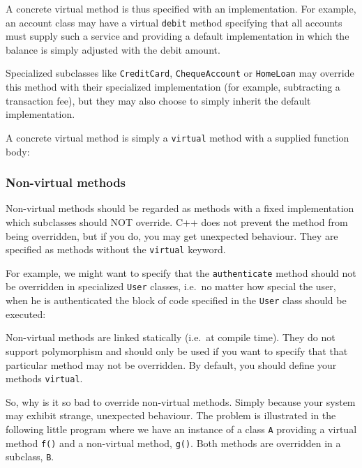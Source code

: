 A concrete virtual method is thus specified with an implementation.
For example, an account class may have a virtual \verb+debit+ method
specifying that all accounts must supply such a service and providing
a default implementation in which the balance is simply adjusted with
the debit amount.

Specialized subclasses like \verb+CreditCard+, \verb+ChequeAccount+
or \verb+HomeLoan+ may override this method with their specialized
implementation (for example, subtracting a transaction fee), but they
may also choose to simply inherit the default implementation.

A concrete virtual method is simply a \verb+virtual+ method with a
supplied function body:



\subsubsection{Non-virtual methods}

Non-virtual methods should be regarded as methods with a fixed 
implementation which subclasses should NOT override. C++ does 
not prevent the method from being overridden, but if you do, 
you may get unexpected behaviour. They are specified as methods
without the \verb+virtual+ keyword. 

For example, we might want to specify that the \verb+authenticate+ 
method should not be overridden in specialized \verb+User+ classes,
i.e.\ no matter how special the user, when he is authenticated the
block of code specified in the \verb+User+ class should be executed:

    
Non-virtual methods are linked statically (i.e.\ at compile time). 
They do not support polymorphism and should only be used if you want to
specify that that particular method may not be overridden. By default, you
should define your methods \verb+virtual+.

So, why is it so bad to override non-virtual methods. Simply because your
system may exhibit strange, unexpected behaviour. The problem is 
illustrated in the following little program where we have an instance of
a class \verb+A+ providing a virtual method \verb+f()+ and a non-virtual
method, \verb+g()+. Both methods are overridden in a subclass, \verb+B+.

